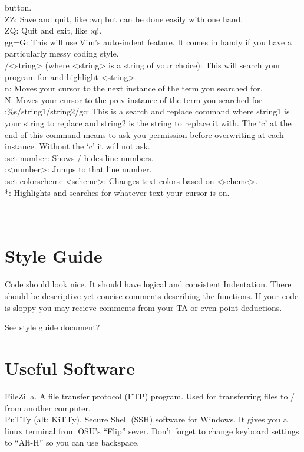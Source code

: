 \documentclass[letterpaper,10pt,titlepage,fleqn]{article}
\begin{document}
button.\\
ZZ: Save and quit, like :wq but can be done easily with one hand.\\
ZQ: Quit and exit, like :q!.\\
gg=G: This will use Vim’s auto-indent feature. It comes in handy if you have a
particularly messy coding style.\\
/<string> (where <string> is a string of your choice): This will search your
program for and highlight <string>.\\
n: Moves your cursor to the next instance of the term you searched for.\\
N: Moves your cursor to the prev instance of the term you searched for. \\
:\%s/string1/string2/gc: This is a search and replace command where string1 is
your string to replace and string2 is the string to replace it with. The ‘c’ at
the end of this command means to ask you permission before overwriting at each
instance. Without the ‘c’ it will not ask.\\
:set number: Shows / hides line numbers.\\
:<number>: Jumps to that line number.\\
:set colorscheme <scheme>: Changes text colors based on <scheme>. \\
*: Highlights and searches for whatever text your cursor is on.\\
\\
\\

\section{Style Guide}
Code should look nice. 
It should have logical and consistent Indentation. 
There should be descriptive yet concise comments describing the functions. If
your code is sloppy you may recieve comments from your TA or even point
deductions.

See style guide document?


\section{Useful Software}
FileZilla. A file transfer protocol (FTP) program. Used for transferring files
to / from another computer. \\

PuTTy (alt: KiTTy). Secure Shell (SSH) software for Windows. It gives you a
linux terminal from OSU’s “Flip” sever. Don’t forget to change keyboard settings
to “Alt-H” so you can use backspace. \\
\end{document}
